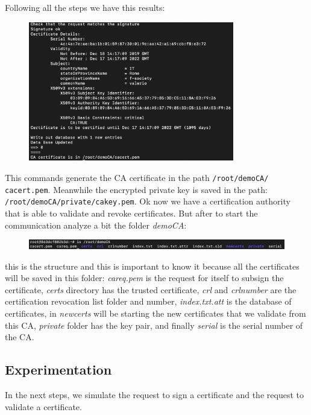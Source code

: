 \documentclass[11pt]{article}
\begin{document}
Following all the steps we have this results:

\begin{figure}[!ht]
 \centering
 \includegraphics[width=0.8\textwidth]{pic3-hw6-7-1635747.png}
 \label{fig:results}
\end{figure}

This commands generate the CA certificate in the path \texttt{/root/demoCA/ cacert.pem}. Meanwhile the encrypted private key is saved in the path: \texttt{/root/demoCA/private/cakey.pem}. Ok now we have a certification authority that is able to validate and revoke certificates. But after to start the communication analyze a bit the folder {\em demoCA}:

\begin{figure}[!ht]
 \includegraphics[width=1\textwidth]{pic4-hw6-7-1635747}
 \label{fig:demoCA}
\end{figure}

this is the structure and this is important to know it because all the certificates will be saved in this folder: {\em careq.pem} is the request for itself to subsign the certificate, {\em certs} directory has the trusted certificate, {\em crl} and {\em crlnumber} are the certification revocation list folder and number, {\em index.txt.att} is the database of certificates, in {\em newcerts} will be starting the new certificates that we validate from this CA, {\em private} folder has the key pair, and finally {\em serial} is the serial number of the CA.

\newpage
\subsection{Experimentation}
In the next steps, we simulate the request to sign a certificate and the request to validate a certificate.
\end{document}
